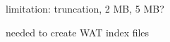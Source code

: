 \documentclass[conference]{IEEEtran}
\begin{document}

limitation: truncation, 2 MB, 5 MB?

needed to create WAT index files


\end{document}
